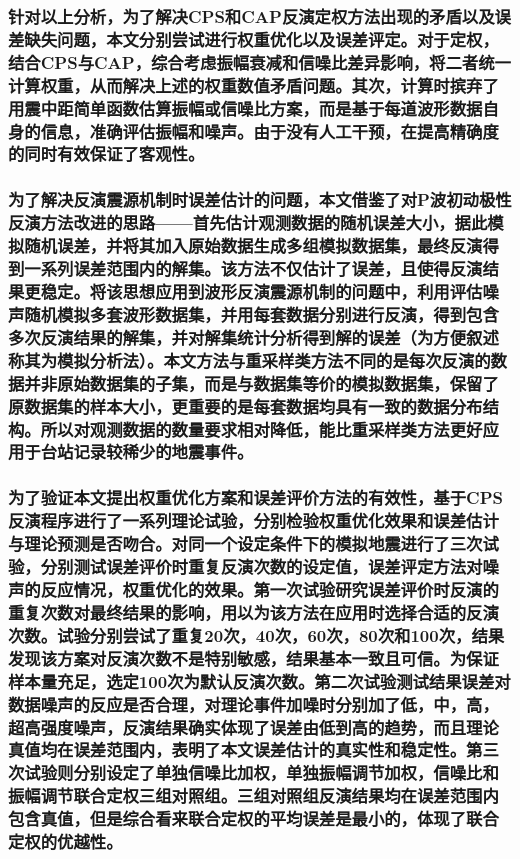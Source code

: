 \documentclass[a4paper,12pt,single,pdftex]{scrartcl}
\begin{document}
\label{ID_1218200436}\subsubsection{针对以上分析，为了解决CPS和CAP反演定权方法出现的矛盾以及误差缺失问题，本文分别尝试进行权重优化以及误差评定。对于定权，结合CPS与CAP，综合考虑振幅衰减和信噪比差异影响，将二者统一计算权重，从而解决上述的权重数值矛盾问题。其次，计算时摈弃了用震中距简单函数估算振幅或信噪比方案，而是基于每道波形数据自身的信息，准确评估振幅和噪声。由于没有人工干预，在提高精确度的同时有效保证了客观性。}

\label{ID_1099326584}\subsubsection{为了解决反演震源机制时误差估计的问题，本文借鉴了\citet{Hardebeck2002}对P波初动极性反演方法改进的思路——首先估计观测数据的随机误差大小，据此模拟随机误差，并将其加入原始数据生成多组模拟数据集，最终反演得到一系列误差范围内的解集。该方法不仅估计了误差，且使得反演结果更稳定\citep{Hardebeck2002}。将该思想应用到波形反演震源机制的问题中，利用评估噪声随机模拟多套波形数据集，并用每套数据分别进行反演，得到包含多次反演结果的解集，并对解集统计分析得到解的误差（为方便叙述称其为模拟分析法）。本文方法与重采样类方法\citep{郑建常2015,Efron1979}不同的是每次反演的数据并非原始数据集的子集，而是与数据集等价的模拟数据集，保留了原数据集的样本大小，更重要的是每套数据均具有一致的数据分布结构。所以对观测数据的数量要求相对降低，能比重采样类方法更好应用于台站记录较稀少的地震事件。}

\label{ID_323720947}\subsubsection{为了验证本文提出权重优化方案和误差评价方法的有效性，基于CPS反演程序进行了一系列理论试验，分别检验权重优化效果和误差估计与理论预测是否吻合。对同一个设定条件下的模拟地震进行了三次试验，分别测试误差评价时重复反演次数的设定值，误差评定方法对噪声的反应情况，权重优化的效果。第一次试验研究误差评价时反演的重复次数对最终结果的影响，用以为该方法在应用时选择合适的反演次数。试验分别尝试了重复20次，40次，60次，80次和100次，结果发现该方案对反演次数不是特别敏感，结果基本一致且可信。为保证样本量充足，选定100次为默认反演次数。第二次试验测试结果误差对数据噪声的反应是否合理，对理论事件加噪时分别加了低，中，高，超高强度噪声，反演结果确实体现了误差由低到高的趋势，而且理论真值均在误差范围内，表明了本文误差估计的真实性和稳定性。第三次试验则分别设定了单独信噪比加权，单独振幅调节加权，信噪比和振幅调节联合定权三组对照组。三组对照组反演结果均在误差范围内包含真值，但是综合看来联合定权的平均误差是最小的，体现了联合定权的优越性。}
\end{document}
